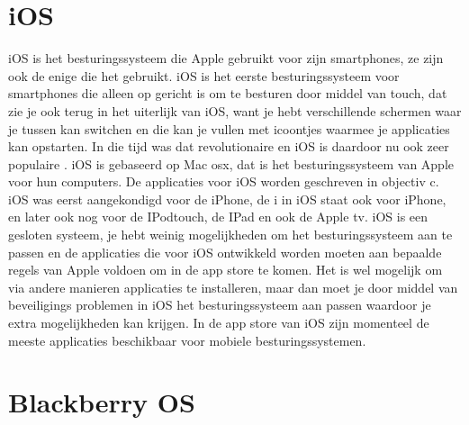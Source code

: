 \section{iOS}

iOS is het besturingssysteem die Apple gebruikt voor zijn smartphones, ze zijn ook de enige die het gebruikt. iOS is het eerste besturingssysteem voor smartphones die alleen op gericht is om te besturen door middel van touch, dat zie je ook terug in het uiterlijk van iOS, want je hebt verschillende schermen waar je tussen kan switchen en die kan je vullen met icoontjes waarmee je applicaties kan opstarten\citep{computerworld}. In die tijd was dat revolutionaire en iOS is daardoor nu ook zeer populaire \citep{mysecondskin}. iOS is gebaseerd op Mac osx, dat is het besturingssysteem van Apple voor hun computers. De applicaties voor iOS worden geschreven in objectiv c. iOS was eerst aangekondigd voor de iPhone, de i in iOS staat ook voor iPhone, en later ook nog voor de IPodtouch, de IPad en ook de Apple tv. iOS is een gesloten systeem, je hebt weinig mogelijkheden om het besturingssysteem aan te passen en de applicaties die voor iOS ontwikkeld worden moeten aan bepaalde regels van Apple voldoen om in de app store te komen. Het is wel mogelijk om via andere manieren applicaties te installeren, maar dan moet je door middel van beveiligings problemen in iOS het besturingssysteem aan passen waardoor je extra mogelijkheden kan krijgen. In de app store van iOS zijn momenteel de meeste applicaties beschikbaar voor mobiele besturingssystemen. 

\section{Blackberry OS}

